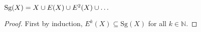 \begin{theorem*}
  $\text{Sg}(X) = X \cup E(X) \cup E^2(X) \cup \ldots$
\end{theorem*}

\begin{proof}
  First by induction, $E^k(X) \subseteq \text{Sg}(X)$ for all $k \in \mathbb{N}$.
\end{proof}